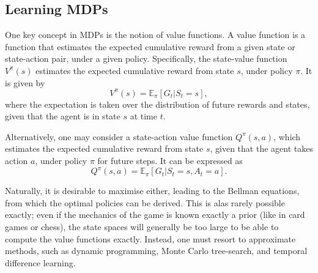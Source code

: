 \subsection{Learning MDPs}
One key concept in MDPs is the notion of value functions.
A value function is a function that estimates the expected cumulative reward from a given state or state-action pair, under a given policy.
Specifically, the state-value function $V^{\pi}(s)$ estimates the expected cumulative reward from state $s$, under policy $\pi$.
It is given by
\begin{equation}
    V^{\pi}(s) = \mathbb{E}_\pi \left[ G_t | S_t = s \right],
\end{equation}
where the expectation is taken over the distribution of future rewards and states, given that the agent is in state $s$ at time $t$.

Alternatively, one may consider a state-action value function $Q^{\pi}(s, a)$, which estimates the expected cumulative reward from state $s$, given that the agent takes action $a$, under policy $\pi$ for future steps.
It can be expressed as
\begin{equation}
    Q^{\pi}(s, a) = \mathbb{E}_\pi \left[ G_t | S_t = s, A_t = a \right].
\end{equation}

Naturally, it is desirable to maximise either, leading to the Bellman equations, from which the optimal policies can be derived.
This is alas rarely possible exactly; even if the mechanics of the game is known exactly a prior (like in card games or chess), the state spaces will generally be too large to be able to compute the value functions exactly.
Instead, one must resort to approximate methods, such as dynamic programming, Monte Carlo tree-search, and temporal difference learning.

